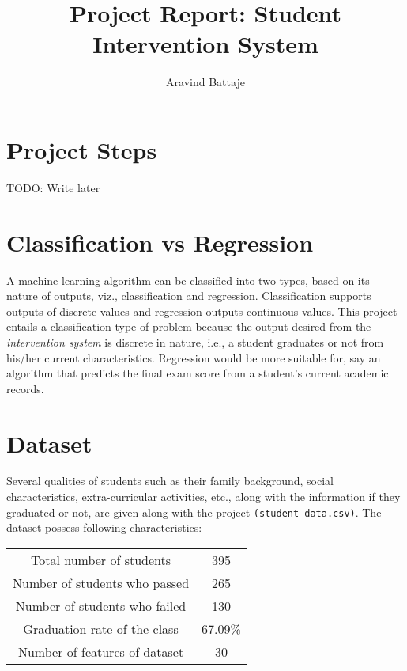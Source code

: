 \documentclass{article}
\begin{document}
	
	\title{Project Report: Student Intervention System}
	\author{Aravind Battaje}
	\maketitle
	\section{Project Steps}
	TODO: Write later
	
	\section{Classification vs Regression}
	A machine learning algorithm can be classified into two types, based on its nature of outputs, viz., classification and regression. Classification supports outputs of discrete values and regression outputs continuous values. This project entails a classification type of problem because the output desired from the \emph{intervention system} is discrete in nature, i.e., a student graduates or not from his/her current characteristics. Regression would be more suitable for, say an algorithm that predicts the final exam score from a student's current academic records.
	
	\section{Dataset}
	Several qualities of students such as their family background, social characteristics, extra-curricular activities, etc., along with the information if they graduated or not, are given along with the project \texttt{(student-data.csv)}. The dataset possess following characteristics:
	\begin{center}
		\begin{tabular}{| c | c |}
			\hline
			Total number of students & 395 \\
			Number of students who passed & 265 \\
			Number of students who failed & 130  \\
			Graduation rate of the class & 67.09\% \\
			Number of features of dataset & 30 \\
			\hline
		\end{tabular}
		\label{tab:data_characteristics}
	\end{center}
\end{document}
